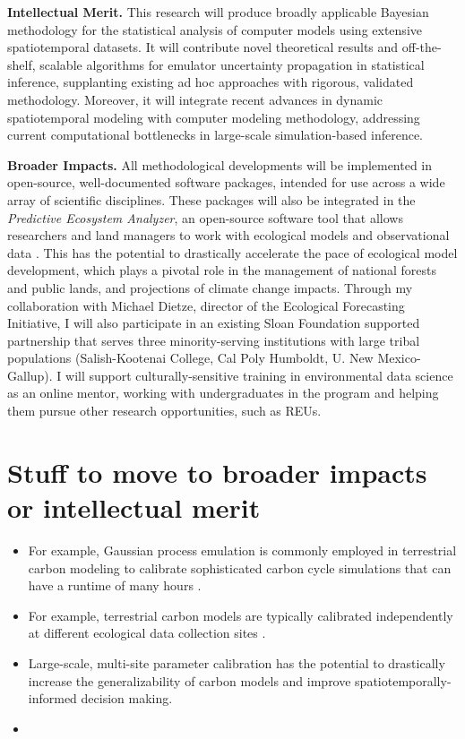\documentclass[11pt]{article}
\begin{document}
\noindent
\textbf{Intellectual Merit.} This research will produce broadly applicable Bayesian methodology for the statistical analysis of computer models using extensive spatiotemporal datasets. It will contribute novel theoretical results and off-the-shelf, scalable algorithms for emulator uncertainty propagation in statistical inference, supplanting existing ad hoc approaches with rigorous, validated methodology. Moreover, it will integrate recent advances in dynamic spatiotemporal modeling with computer modeling methodology, addressing current computational bottlenecks in large-scale simulation-based inference.

\noindent
\textbf{Broader Impacts.} All methodological developments will be implemented in open-source, well-documented software packages, intended for use across a wide array of scientific disciplines. These packages will also be integrated in the \textit{Predictive Ecosystem Analyzer}, an open-source software tool that allows researchers and land managers to work with ecological models and observational data \cite{Fer}. This has the potential to drastically accelerate the pace of ecological model development, which plays a pivotal role in the management of national forests and public lands, and projections of climate change impacts. Through my collaboration with Michael Dietze, director of the Ecological Forecasting Initiative, I will also participate in an existing Sloan Foundation supported partnership that serves three minority-serving institutions with large tribal populations (Salish-Kootenai College, Cal Poly Humboldt, U. New Mexico-Gallup). I will support culturally-sensitive training in environmental data science as an online mentor, working with undergraduates in the program and helping them pursue other research opportunities, such as REUs. 


\section{Stuff to move to broader impacts or intellectual merit}
\begin{itemize}
\item For example, Gaussian process emulation is commonly employed in terrestrial carbon modeling to calibrate sophisticated carbon cycle simulations that can have a runtime of many hours \cite{Fer}.
\item For example, terrestrial carbon models are typically calibrated independently at different ecological data collection sites \cite{Fer2}.
\item Large-scale, multi-site parameter calibration has the potential to drastically increase the generalizability of carbon models and improve spatiotemporally-informed decision making. 
\item 
\end{itemize}
\end{document}
